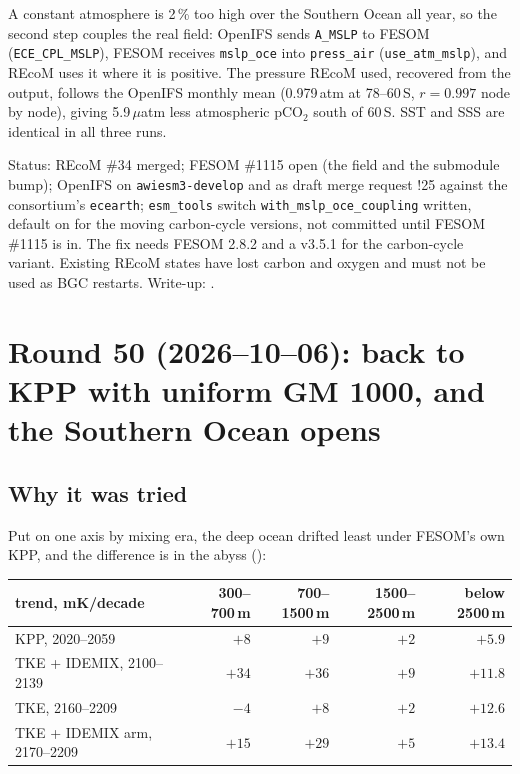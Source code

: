 \documentclass[10pt]{article}
\begin{document}
A constant atmosphere is 2\,\% too high over the Southern Ocean all year, so the second step couples
the real field: OpenIFS sends \texttt{A\_MSLP} to FESOM (\texttt{ECE\_CPL\_MSLP}), FESOM receives
\texttt{mslp\_oce} into \texttt{press\_air} (\texttt{use\_atm\_mslp}), and REcoM uses it where it is
positive. The pressure REcoM used, recovered from the output, follows the OpenIFS monthly mean
(0.979\,atm at 78--60\,S, $r=0.997$ node by node), giving 5.9\,$\mu$atm less atmospheric pCO$_2$
south of 60\,S. SST and SSS are identical in all three runs.

Status: REcoM \#34 merged; FESOM \#1115 open (the field and the submodule bump); OpenIFS on
\texttt{awiesm3-develop} and as draft merge request !25 against the consortium's \texttt{ecearth};
\texttt{esm\_tools} switch \texttt{with\_mslp\_oce\_coupling} written, default on for the moving
carbon-cycle versions, not committed until FESOM \#1115 is in. The fix needs FESOM 2.8.2 and a v3.5.1
for the carbon-cycle variant. Existing REcoM states have lost carbon and oxygen and must not be used
as BGC restarts. Write-up: .

\section{Round 50 (2026--10--06): back to KPP with uniform GM 1000, and the Southern Ocean opens}\label{sec:round50}

\subsection{Why it was tried}\label{sub:r50why}

Put on one axis by mixing era, the deep ocean drifted least under FESOM's own KPP, and the difference
is in the abyss ():

\begin{center}\small
\begin{tabular}{lrrrr}
\toprule
trend, mK/decade & 300--700\,m & 700--1500\,m & 1500--2500\,m & below 2500\,m \\
\midrule
KPP, 2020--2059 & $+8$ & $+9$ & $+2$ & $+5.9$ \\
TKE + IDEMIX, 2100--2139 & $+34$ & $+36$ & $+9$ & $+11.8$ \\
TKE, 2160--2209 & $-4$ & $+8$ & $+2$ & $+12.6$ \\
TKE + IDEMIX arm, 2170--2209 & $+15$ & $+29$ & $+5$ & $+13.4$ \\
\bottomrule
\end{tabular}
\end{center}
\end{document}
